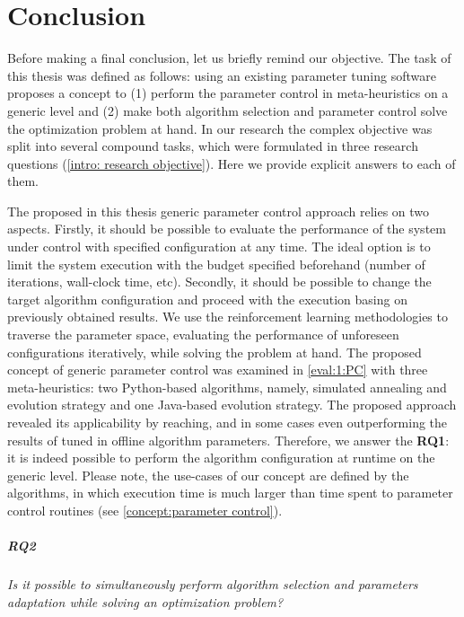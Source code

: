 \chapter{Conclusion}\label{conclusion}
Before making a final conclusion, let us briefly remind our objective.
The task of this thesis was defined as follows: using an existing parameter tuning software proposes a concept to (1) perform the parameter control in meta-heuristics on a generic level and (2) make both algorithm selection and parameter control solve the optimization problem at hand. In our research the complex objective was split into several compound tasks, which were formulated in three research questions (\cref{intro: research objective}). Here we provide explicit answers to each of them.

The proposed in this thesis generic parameter control approach relies on two aspects. Firstly, it should be possible to evaluate the performance of the system under control with specified configuration at any time. The ideal option is to limit the system execution with the budget specified beforehand (number of iterations, wall-clock time, etc). Secondly, it should be possible to change the target algorithm configuration and proceed with the execution basing on previously obtained results. We use the reinforcement learning methodologies to traverse the parameter space, evaluating the performance of unforeseen configurations iteratively, while solving the problem at hand. The proposed concept of generic parameter control was examined in \cref{eval:1:PC} with three meta-heuristics: two Python-based algorithms, namely, simulated annealing and evolution strategy and one Java-based evolution strategy. The proposed approach revealed its applicability by reaching, and in some cases even outperforming the results of tuned in offline algorithm parameters. Therefore, we answer the \textbf{RQ1}: it is indeed possible to perform the algorithm configuration at runtime on the generic level. Please note, the use-cases of our concept are defined by the algorithms, in which execution time is much larger than time spent to parameter control routines (see \cref{concept:parameter control}).

\paragraph{RQ2} \emph{Is it possible to simultaneously perform algorithm selection and parameters adaptation while solving an optimization problem?}

